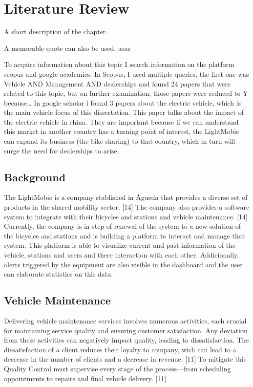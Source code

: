 \chapter{Literature Review}%
\label{chapter:literatureReview}

\begin{introduction}
A short description of the chapter.

A memorable quote can also be used. asas
\end{introduction} 


To acquire information about this topic I search information on the platform scopus and google academics. 
In Scopus, I used multiple queries, the first one was Vehicle AND Management AND dealerships and found 24 papers that were related to this topic, but on further examination, those papers were reduced to Y because… 
In google scholar i found 3 papers about the electric vehicle, which is the main vehicle focus of this dissertation. 
This paper talks about the impact of the electric vehicle in china. 
They are important because if we can understand this market in another country has a turning point of interest, the LightMobie can expand its business (the bike sharing) to that country, which in turn will surge the need for dealerships to arise.  


\section{Background}

The LightMobie is a company stablished in Águeda that provides a diverse set of products in the shared mobility sector. [14]
The company also provides a software system to integrate with their bicycles and stations and vehicle maintenance. [14]
Currently, the company is in step of renewal of the system to a new solution of the bicycles and stations and is building a platform to interact and manage that system.
This platform is able to visualize current and past information of the vehicle, stations and users and there interaction with each other.
Addicionally, alerts triggered by the equipment are also visible in the dashboard and the user can elaborate statistics on this data.

\section{Vehicle Maintenance}

Delivering vehicle maintenance services involves numerous activities, each crucial for maintaining service quality and ensuring customer satisfaction. 
Any deviation from these activities can negatively impact quality, leading to dissatisfaction. 
The dissatisfaction of a client reduces their loyalty to company, wich can lead to a decrease in the number of clients and a decrease in revenue. [11]
To mitigate this Quality Control must supervise every stage of the process—from scheduling appointments to repairs and final vehicle delivery. [11]

